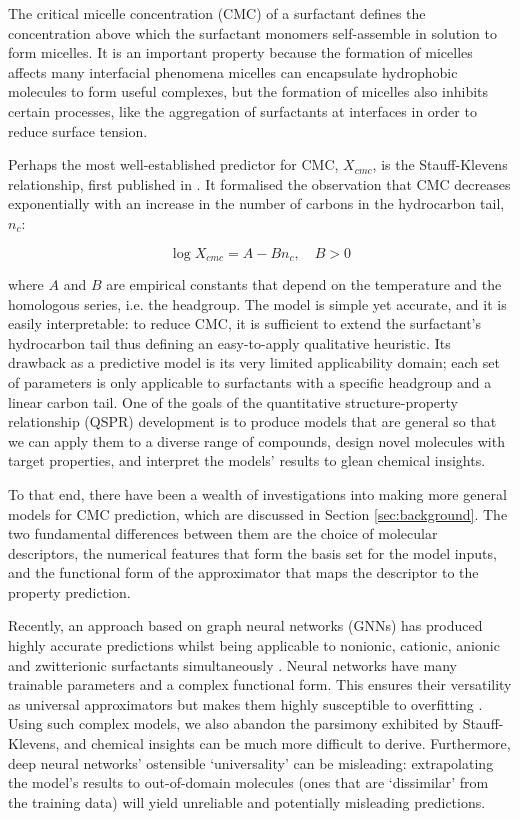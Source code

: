 The critical micelle concentration (CMC) of a surfactant defines the concentration above which the surfactant monomers self-assemble in solution to form micelles. It is an important property because the formation of micelles affects many interfacial phenomena \cite{rosenSurfactantsInterfacialPhenomena2012} micelles can encapsulate hydrophobic molecules to form useful complexes, but the formation of micelles also inhibits certain processes, like the aggregation of surfactants at interfaces in order to reduce surface tension.

Perhaps the most well-established predictor for CMC, $X_{cmc}$, is the Stauff-Klevens relationship, first published in \citeyear{klevensStructureAggregationDilate1953} \cite{klevensStructureAggregationDilate1953}. It formalised the observation that CMC decreases exponentially with an increase in the number of carbons in the hydrocarbon tail, $n_c$:

\begin{equation}
    \label{eq:klevens}
    \log X_{cmc} = A - Bn_c, \quad B > 0
\end{equation}

where $A$ and $B$ are empirical constants that depend on the temperature and the homologous series, i.e. the headgroup. The model is simple yet accurate, and it is easily interpretable: to reduce CMC, it is sufficient to extend the surfactant's hydrocarbon tail thus defining an easy-to-apply qualitative heuristic. Its drawback as a predictive model is its very limited applicability domain; each set of parameters is only applicable to surfactants with a specific headgroup and a linear carbon tail.
One of the goals of the quantitative structure-property relationship (QSPR) development is to produce models that are general so that we can apply them to a diverse range of compounds, design novel molecules with target properties, and
interpret the models' results to glean chemical insights.

To that end, there have been a wealth of investigations into making more general models for CMC prediction, which are discussed in Section \ref{sec:background}. The two fundamental differences between them are the choice of molecular
descriptors, the numerical features that form the basis set for the model inputs, and the functional form of the approximator that maps the descriptor to the property prediction. 

Recently, an approach based on graph neural networks (GNNs) has produced highly accurate predictions whilst being applicable to nonionic, cationic, anionic and zwitterionic surfactants simultaneously
\cite{qinPredictingCriticalMicelle2021}. Neural networks have many trainable parameters and a complex functional form. This ensures their versatility as universal approximators but makes them highly susceptible to overfitting \cite{bejaniSystematicReviewOverfitting2021}. Using such complex models, we also abandon the parsimony exhibited by Stauff-Klevens, and chemical insights can be much more difficult to derive. Furthermore, deep neural networks' ostensible `universality' can be misleading: extrapolating the model's results to out-of-domain molecules (ones that are `dissimilar' from the training data) will yield unreliable and potentially misleading predictions.

